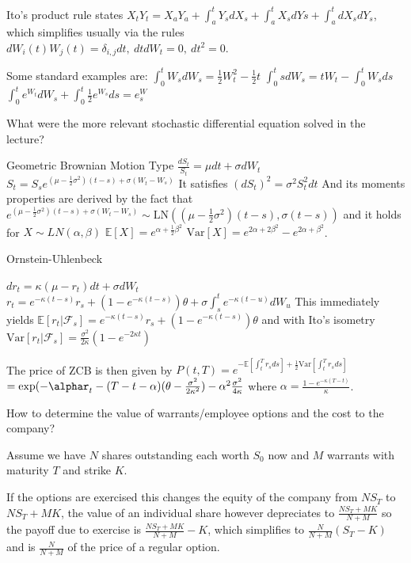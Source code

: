 Ito's product rule states
\( X_tY_t = X_aY_a + \int_a^t Y_s dX_s + \int_a^t X_s dYs + \int_a^t dX_sdY_s \),
which simplifies usually via the rules \( dW_i(t)W_j(t) = \delta_{i,j}dt,\ dtdW_t = 0,\ dt^2 = 0 \).

Some standard examples are:
\( \int_0^t W_s dW_s = \frac{1}{2}W^2_t - \frac{1}{2}t \)
\( \int_0^t s dW_s = tW_t - \int_0^t W_s ds \)
\( \int_0^t e^{W_t} dW_s + \int_0^t \frac{1}{2}e^{W_s} ds = e^W_s \)



What were the more relevant stochastic differential equation solved in the lecture?

Geometric Brownian Motion Type
\( \frac{dS_t}{S_t} = \mu dt + \sigma dW_t \)
\( S_t = S_s e^{(\mu - \frac{1}{2}\sigma^2)(t - s) + \sigma(W_t - W_s)}\)
It satisfies 
\( (dS_t)^2 = \sigma^2 S_t^2 dt \)
And its moments properties are derived by the fact that 
\( e^{(\mu - \frac{1}{2}\sigma^2)(t - s) + \sigma(W_t - W_s)} \sim \text{LN}((\mu - \frac{1}{2}\sigma^2)(t - s), \sigma(t - s)) \)
and it holds for \( X \sim LN(\alpha,\beta)  \)
\( \mathbb{E}[X] = e^{\alpha + \frac{1}{2}\beta^2} \)
\( \text{Var}[X] = e^{2\alpha + 2\beta^2} - e^{2\alpha + \beta^2} \).

Ornstein-Uhlenbeck

\( dr_t = \kappa(\mu - r_t)dt + \sigma dW_t  \)
\( r_t = e^{-\kappa (t-s)}r_s + (1 - e^{-\kappa(t-s)})\theta + \sigma\int_s^t e^{-\kappa(t - u)}dW_u \)
This immediately yields
\( \mathbb{E}[r_t|\mathcal{F}_s] = e^{-\kappa (t-s)}r_s + (1 - e^{-\kappa(t-s)})\theta \)
and with Ito's isometry
\( \text{Var}[r_t|\mathcal{F}_s] = \frac{\sigma^2}{2\kappa}(1 - e^{-2 \kappa t}) \)

The price of ZCB is then given by
\( P(t, T) = e^{-\mathbb{E}[\int_t^T r_s ds] + \frac{1}{2}\text{Var}[\int_t^T r_s ds]} \)
\( = \text{exp}(- \alphar_t - (T - t - \alpha)(\theta - \frac{\sigma^2}{2\kappa^2}) - \alpha^2 \frac{\sigma^2}{4\kappa} \)
where \( \alpha = \frac{1 - e^{-\kappa(T - t)}}{\kappa} \).



How to determine the value of warrants/employee options and the cost to the company?

Assume we have \( N \) shares outstanding each worth \( S_0 \) now and \( M \) warrants with maturity \( T \)
and strike \( K \).

If the options are exercised this changes the equity of the company from \( NS_T \) to \( NS_T + MK\),
the value of an individual share however depreciates to 
\( \frac{NS_T + MK}{N + M} \) so the payoff due to exercise is \( \frac{NS_T + MK}{N + M} - K \),
which simplifies to \( \frac{N}{N+M}(S_T - K) \)
and is \( \frac{N}{N+M} \) of the price of a regular option.

